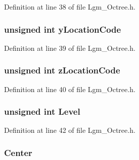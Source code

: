 Definition at line 38 of file Lgm\_\-Octree.h.\hypertarget{struct___lgm___octree_cell_fd9d41af65e45952ff7a6ec326f8ce86}{
\subsubsection[{yLocationCode}]{\setlength{\rightskip}{0pt plus 5cm}unsigned int {\bf yLocationCode}}}
\label{struct___lgm___octree_cell_fd9d41af65e45952ff7a6ec326f8ce86}




Definition at line 39 of file Lgm\_\-Octree.h.\hypertarget{struct___lgm___octree_cell_197011505d40af9f13649872c67a61e1}{
\subsubsection[{zLocationCode}]{\setlength{\rightskip}{0pt plus 5cm}unsigned int {\bf zLocationCode}}}
\label{struct___lgm___octree_cell_197011505d40af9f13649872c67a61e1}




Definition at line 40 of file Lgm\_\-Octree.h.\hypertarget{struct___lgm___octree_cell_a3d2c0758a70c3bb49a3d73a14a94d0a}{
\subsubsection[{Level}]{\setlength{\rightskip}{0pt plus 5cm}unsigned int {\bf Level}}}
\label{struct___lgm___octree_cell_a3d2c0758a70c3bb49a3d73a14a94d0a}




Definition at line 42 of file Lgm\_\-Octree.h.\hypertarget{struct___lgm___octree_cell_6db57193d204ce24705e3e95a23bc7c1}{
\subsubsection[{Center}]{ {\bf Center}}}
\label{struct___lgm___octree_cell_6db57193d204ce24705e3e95a23bc7c1}




